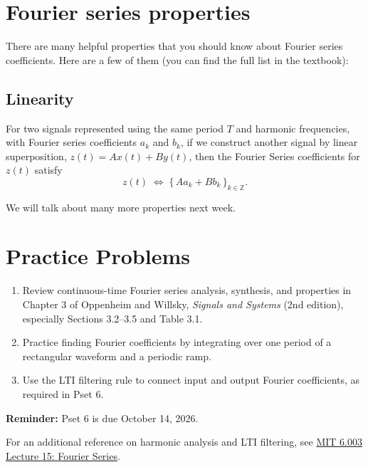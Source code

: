 \section{Fourier series properties}
\label{sec:w6l2-properties}
There are many helpful properties that you should know about Fourier series coefficients. Here are a few of them (you can find the full list in the textbook):

\subsection{Linearity}

For two signals represented using the same period $T$ and harmonic frequencies, with Fourier series coefficients $a_k$ and $b_k$, if we construct another signal by linear superposition, $z(t)=A x(t)+B y(t)$, then the Fourier Series coefficients for $z(t)$ satisfy
\[
z(t)\;\Longleftrightarrow\; \{\,A a_k + B b_k\,\}_{k\in\mathbb{Z}}.
\]

We will talk about many more properties next week.

\section{Practice Problems}
\begin{enumerate}
  \item Review continuous-time Fourier series analysis, synthesis, and
  properties in Chapter 3 of Oppenheim and Willsky, \emph{Signals and Systems}
  (2nd edition), especially Sections 3.2--3.5 and Table 3.1.
  \item Practice finding Fourier coefficients by integrating over one
  period of a rectangular waveform and a periodic ramp.
  \item Use the LTI filtering rule to connect input and output Fourier
  coefficients, as required in Pset 6.
\end{enumerate}
\textbf{Reminder:} Pset 6 is due October 14, 2026.

For an additional reference on harmonic analysis and LTI filtering, see
\href{https://ocw.mit.edu/courses/6-003-signals-and-systems-fall-2011/72c3d01402fa6b7c109b7b88d399115e_MIT6_003F11_lec15.pdf}{MIT 6.003 Lecture 15: Fourier Series}.
